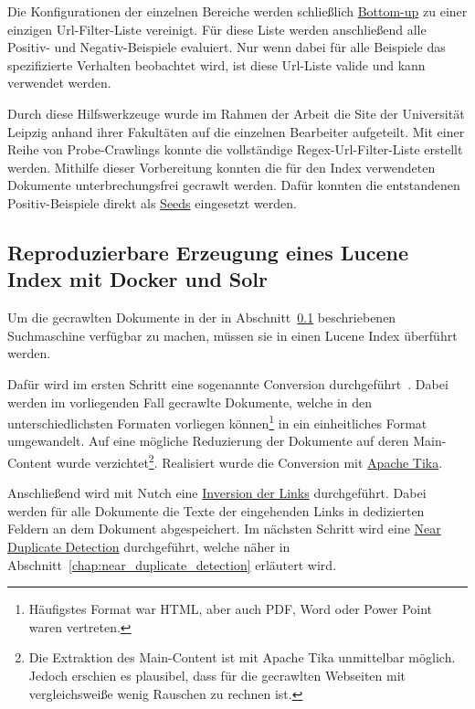 Die Konfigurationen der einzelnen Bereiche werden schließlich \href{https://de.wikipedia.org/wiki/Top-down_und_Bottom-up}{Bottom-up} zu einer einzigen 
Url-Filter-Liste vereinigt.
Für diese Liste werden anschließend alle Positiv- und Negativ-Beispiele evaluiert.
Nur wenn dabei für alle Beispiele das spezifizierte Verhalten beobachtet wird, ist diese Url-Liste valide und kann verwendet werden.

Durch diese Hilfswerkzeuge wurde im Rahmen der Arbeit die Site der Universität Leipzig anhand ihrer Fakultäten auf die einzelnen Bearbeiter aufgeteilt.
Mit einer Reihe von Probe-Crawlings konnte die vollständige Regex-Url-Filter-Liste erstellt werden.
Mithilfe dieser Vorbereitung konnten die für den Index verwendeten Dokumente unterbrechungsfrei gecrawlt werden.
Dafür konnten die entstandenen Positiv-Beispiele direkt als \href{https://wiki.apache.org/nutch/NutchTutorial#Create_a_URL_seed_list-1}{Seeds} eingesetzt werden.

\subsection{Reproduzierbare Erzeugung eines Lucene Index mit Docker und Solr}

Um die gecrawlten Dokumente in der in Abschnitt~\ref{} beschriebenen Suchmaschine verfügbar zu machen, müssen sie in einen Lucene Index überführt werden.

Dafür wird im ersten Schritt eine sogenannte Conversion durchgeführt~\cite{croft.chap2}.
Dabei werden im vorliegenden Fall gecrawlte Dokumente,
welche in den unterschiedlichsten Formaten vorliegen können\footnote{Häufigstes Format war HTML, aber auch PDF, Word oder Power Point waren vertreten.}
in ein einheitliches Format umgewandelt.
Auf eine mögliche Reduzierung der Dokumente auf deren Main-Content wurde verzichtet\footnote{Die Extraktion des Main-Content ist mit Apache Tika
unmittelbar möglich. Jedoch erschien es plausibel, dass für die gecrawlten Webseiten mit vergleichsweiße wenig Rauschen zu rechnen ist.}.
Realisiert wurde die Conversion mit \href{https://en.wikipedia.org/wiki/Apache_Tika}{Apache Tika}.

Anschließend wird mit Nutch eine \href{https://wiki.apache.org/nutch/bin/nutch_invertlinks}{Inversion der Links} durchgeführt.
Dabei werden für alle Dokumente die Texte der eingehenden Links in dedizierten Feldern an dem Dokument abgespeichert.
Im nächsten Schritt wird eine \href{https://github.com/apache/nutch/blob/master/src/java/org/apache/nutch/crawl/TextProfileSignature.java}{Near Duplicate Detection}
durchgeführt, welche näher in Abschnitt~\ref{chap:near_duplicate_detection} erläutert wird.

